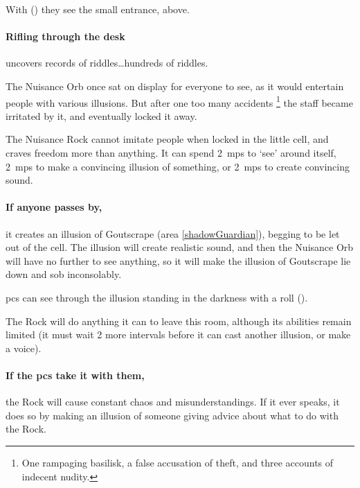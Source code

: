 With  (\tn[12]) they see the small entrance, above.

\paragraph{Rifling through the desk}
uncovers records of riddles\ldots hundreds of riddles.


\begin{exampletext}
  The Nuisance Orb once sat on display for everyone to see, as it would entertain people with various illusions.
  But after one too many accidents%
  \footnote{One rampaging basilisk, a false accusation of theft, and three accounts of indecent nudity.}
  the staff became irritated by it, and eventually locked it away.
\end{exampletext}

\setcounter{wounds}{2}
  {
    \setcounter{Fire}{2}
    \setcounter{Air}{2}
    \setcounter{Academics}{2}
    \setcounter{Crafts}{1}
    \setcounter{Empathy}{2}
    \setcounter{Deceit}{2}
  }%

\showStdSpells[
  \setcounter{diceNo}{0}
]

The Nuisance Rock cannot imitate people when locked in the little cell, and craves freedom more than anything.
It can spend 2~\glspl{mp} to `see' around itself, 2~\glspl{mp} to make a convincing illusion of something, or 2~\glspl{mp} to create convincing sound.

\paragraph{If anyone passes by,}
it creates an illusion of Goutscrape (area \vref{shadowGuardian}), begging to be let out of the cell.
The illusion will create realistic sound, and then the Nuisance Orb will have no further  to see anything, so it will make the illusion of Goutscrape lie down and sob inconsolably.

\Glspl{pc} can see through the illusion standing in the darkness with a  roll
(\tn[12]).

The Rock will do anything it can to leave this room, although its abilities remain limited (it must wait 2 more \glspl{interval} before it can cast another illusion, or make a voice).

\paragraph{If the \glspl{pc} take it with them,}
the Rock will cause constant chaos and misunderstandings.
If it ever speaks, it does so by making an illusion of someone giving advice about what to do with the Rock.

